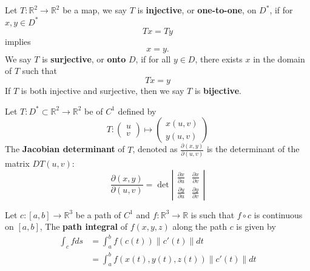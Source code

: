 \documentclass[openany]{book}
\newcommand{\R}{\mathbb{R}}
\begin{document}
\begin{defn}
    Let $T:\R^2\to\R^2$ be a map, we say $T$ is \textbf{injective}, or \textbf{one-to-one}, on $D^*$, if for $x,y\in D^*$
    \begin{equation*}
        Tx=Ty
    \end{equation*}
    implies
    \begin{equation*}
        x=y.
    \end{equation*}
    We say $T$ is \textbf{surjective}, or \textbf{onto} $D$, if for all $y\in D$, there exists $x$ in the domain of $T$ such that 
    \begin{equation*}
        Tx=y
    \end{equation*}
    If $T$ is both injective and surjective, then we say $T$ is \textbf{bijective}.
\end{defn}


\begin{defn}
    Let $T:D^*\subset\R^2\to\R^2$ be of $C^1$ defined by 
    \begin{equation*}
        T:\begin{pmatrix}
            u\\
            v
        \end{pmatrix}\mapsto \begin{pmatrix}
            x(u,v)\\
            y(u,v)
        \end{pmatrix}
    \end{equation*}
    The \textbf{Jacobian determinant} of $T$, denoted as $\frac{\partial(x,y)}{\partial(u,v)}$ is the determinant of the matrix $DT(u,v)$:
    \begin{equation*}
        \frac{\partial(x,y)}{\partial(u,v)}=\det\left|\begin{matrix}
            \frac{\partial x}{\partial u}& \frac{\partial x}{\partial v}\\
            \frac{\partial y}{\partial u}&\frac{\partial y}{\partial v}
        \end{matrix}\right|
    \end{equation*}
\end{defn}





\begin{defn}
    Let $c:[a,b]\to\R^3$ be a path of $C^1$ and $f:\R^3\to\R$ is such that $f\circ c$ is continuous on $[a,b]$, The \textbf{path integral} of $f(x,y,z)$ along the path $c$ is given by 
    \begin{align*}
        \int_c fds&=\int_a^bf(c(t))\|c'(t)\|dt\\
        &=\int_a^bf(x(t),y(t), z(t))\|c'(t)\|dt
    \end{align*}
\end{defn}
\end{document}
